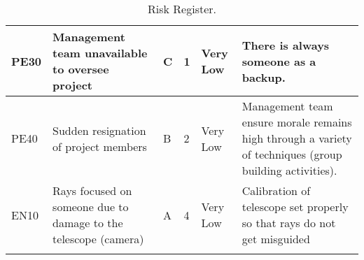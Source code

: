\begin{longtable}{|m{}| m{} |m{} |m{}|m{}| m{}|}
PE30 & Management team unavailable to oversee project						& C & 1 & \cellcolor[HTML]{34FF34}Very Low	& There is always someone as a backup.\\\hline

PE40 & Sudden resignation of project members								& B & 2 & \cellcolor[HTML]{34FF34}Very Low	& Management team ensure morale remains high through a variety of techniques (group building activities).\\\hline


EN10 & Rays focused on someone due to damage to the telescope (camera)		& A & 4 & \cellcolor[HTML]{34FF34}Very Low	& Calibration of telescope set properly so that rays do not get misguided\\\hline


\caption{Risk Register.}
\label{tab:risk-register}
\end{longtable}
\raggedbottom